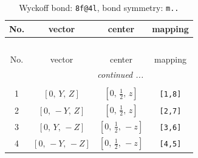 \documentclass[fleqn,8pt]{jsarticle}
\begin{document}
\renewcommand{\arraystretch}{1.2}
\begin{longtable}{cccc}
\caption{Wyckoff bond: {\tt 8f@4l}, bond symmetry: {\tt m..}}
 \\
 \hline \hline
No. & vector & center & mapping \\ \hline \endfirsthead

\multicolumn{3}{l}{\tablename\ \thetable{}} \\
 \hline \hline
No. & vector & center & mapping \\ \hline \endhead

 \hline \hline
\multicolumn{3}{r}{\footnotesize\it continued ...} \\ \endfoot

 \hline \hline
\multicolumn{3}{r}{} \\ \endlastfoot

1 & $\left[ 0,\, Y,\, Z \right]$ & $\left[ 0,\, \frac{1}{2},\, z \right]$ & {\tt [1,8]} \\ \hline
2 & $\left[ 0,\, - Y,\, Z \right]$ & $\left[ 0,\, \frac{1}{2},\, z \right]$ & {\tt [2,7]} \\ \hline
3 & $\left[ 0,\, Y,\, - Z \right]$ & $\left[ 0,\, \frac{1}{2},\, - z \right]$ & {\tt [3,6]} \\ \hline
4 & $\left[ 0,\, - Y,\, - Z \right]$ & $\left[ 0,\, \frac{1}{2},\, - z \right]$ & {\tt [4,5]} \\
\end{longtable}
\renewcommand{\arraystretch}{1.2}
\end{document}
